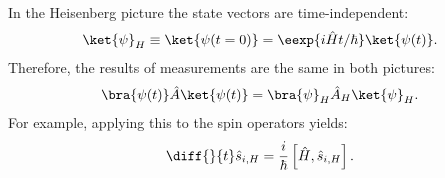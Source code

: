 					In the Heisenberg picture the state vectors are time-in\-de\-pen\-dent:
					\begin{align}
						\ket{\psi}_H \equiv \ket{\psi(t=0)}=\eexp{i{\hat{H}}t/{\hbar}} \ket{\psi(t)}.
					\end{align}
					Therefore, the results of measurements are the same in both pictures:
					\begin{align}
						\bra{\psi(t)}\hat{A}\ket{\psi(t)} = \bra{\psi}_H \hat{A}_H \ket{\psi}_H.
					\end{align}
					For example, applying this to the spin operators yields:
					\begin{align}
						\diff{}{t}\hat{s}_{i,H}=\frac{i}{\hbar}\left[\hat{H},\hat{s}_{i,H}\right].
					\end{align}

	